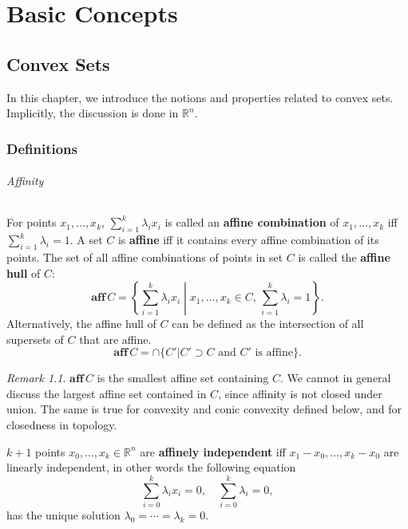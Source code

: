 \documentclass[openany]{book}
\theoremstyle{definition}
\theoremstyle{remark}
\newtheorem*{remark}{Remark}
\begin{document}
\part{Basic Concepts}
\chapter{Convex Sets}
In this chapter, we introduce the notions and properties related to convex sets. Implicitly, the discussion is done in $\mathbb{R}^n$.

\section{Definitions}
\paragraph{Affinity}
For points $x_1,\ldots,x_k$, $\sum_{i=1}^k\lambda_ix_i$ is called an \textbf{affine combination} of $x_1,\ldots,x_k$ iff $\sum_{i=1}^k\lambda_i=1$. A set $C$ is \textbf{affine} iff it contains every affine combination of its points. The set of all affine combinations of points in set $C$ is called the \textbf{affine hull} of $C$:
\begin{equation}\label{affHullInner}
    \mathbf{aff}\,C=\left\{\sum_{i=1}^k\lambda_ix_i\middle|x_1,\ldots,x_k\in C,\,\sum_{i=1}^k\lambda_i=1\right\}.
\end{equation}
Alternatively, the affine hull of $C$ can be defined as the intersection of all supersets of $C$ that are affine.
\begin{equation}
    \mathbf{aff}\,C=\cap\{C'|C'\supset C\textrm{ and }C'\textrm{ is affine}\}.
\end{equation}
\begin{remark}
    $\mathbf{aff}\,C$ is the smallest affine set containing $C$. We cannot in general discuss the largest affine set contained in $C$, since affinity is not closed under union. The same is true for convexity and conic convexity defined below, and for closedness in topology.
\end{remark}

$k+1$ points $x_0,\ldots,x_k\in \mathbb{R}^n$ are \textbf{affinely independent} iff $x_1-x_0,\ldots,x_k-x_0$ are linearly independent, in other words the following equation
\begin{equation}\label{addHullOuter}
    \sum_{i=0}^{k}\lambda_ix_i=0,\quad \sum_{i=0}^{k}\lambda_i=0,
\end{equation}
has the unique solution $\lambda_0=\cdots=\lambda_k=0$.
\end{document}

